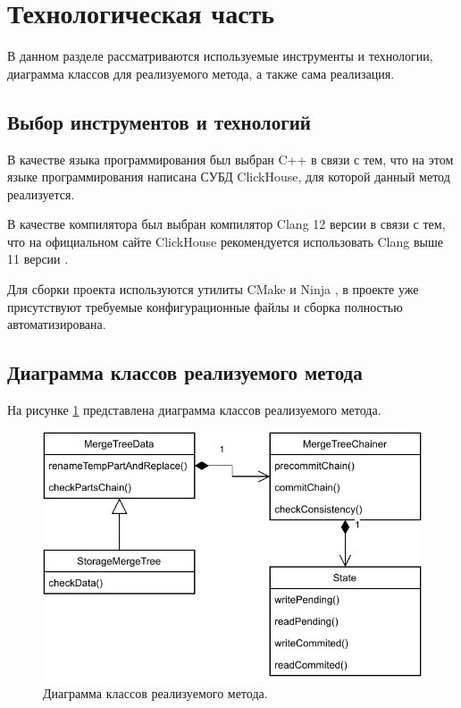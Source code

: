 \section{Технологическая часть}

В данном разделе рассматриваются используемые инструменты и технологии, диаграмма классов для реализуемого метода, а также сама реализация.

\subsection{Выбор инструментов и технологий}

В качестве языка программирования был выбран C++ \cite{cpp} в связи с тем, что на этом языке программирования написана СУБД ClickHouse, для которой данный метод реализуется.

В качестве компилятора был выбран компилятор Clang \cite{clang} 12 версии в связи с тем, что на официальном сайте ClickHouse рекомендуется использовать Clang выше 11 версии \cite{chcompiler}.

Для сборки проекта используются утилиты CMake \cite{cmake} и Ninja \cite{ninjabuild}, в проекте уже присутствуют требуемые конфигурационные файлы и сборка полностью автоматизирована.

\subsection{Диаграмма классов реализуемого метода}

На рисунке \ref{fig:classscheme} представлена диаграмма классов реализуемого метода.

\begin{figure}[hbtp]
	\centering
	\includegraphics[scale=0.8]{img/classscheme.pdf}
	\caption{Диаграмма классов реализуемого метода.}
	\label{fig:classscheme}
\end{figure}

